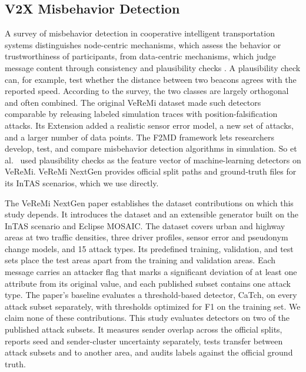 \documentclass[preprint,12pt,numafflabel]{elsarticle}
\begin{document}
\subsection{V2X Misbehavior Detection}
A survey of misbehavior detection in cooperative intelligent transportation systems distinguishes node-centric mechanisms, which assess the behavior or trustworthiness of participants, from data-centric mechanisms, which judge message content through consistency and plausibility checks \cite{vanderheijden2019survey}. A plausibility check can, for example, test whether the distance between two beacons agrees with the reported speed. According to the survey, the two classes are largely orthogonal and often combined. The original VeReMi dataset \cite{vanderheijden2018veremi} made such detectors comparable by releasing labeled simulation traces with position-falsification attacks. Its Extension \cite{kamel2020veremiextension} added a realistic sensor error model, a new set of attacks, and a larger number of data points. The F2MD framework \cite{kamel2020f2md} lets researchers develop, test, and compare misbehavior detection algorithms in simulation. So et al.\ \cite{so2018plausibility} used plausibility checks as the feature vector of machine-learning detectors on VeReMi. VeReMi NextGen \cite{veremi2026} provides official split paths and ground-truth files for its InTAS scenarios, which we use directly.

The VeReMi NextGen paper \cite{hermann2026veremi} establishes the dataset contributions on which this study depends. It introduces the dataset and an extensible generator built on the InTAS scenario and Eclipse MOSAIC. The dataset covers urban and highway areas at two traffic densities, three driver profiles, sensor error and pseudonym change models, and 15 attack types. Its predefined training, validation, and test sets place the test areas apart from the training and validation areas. Each message carries an attacker flag that marks a significant deviation of at least one attribute from its original value, and each published subset contains one attack type. The paper's baseline evaluates a threshold-based detector, CaTch, on every attack subset separately, with thresholds optimized for F1 on the training set. We claim none of these contributions. This study evaluates detectors on two of the published attack subsets. It measures sender overlap across the official splits, reports seed and sender-cluster uncertainty separately, tests transfer between attack subsets and to another area, and audits labels against the official ground truth.
\end{document}
